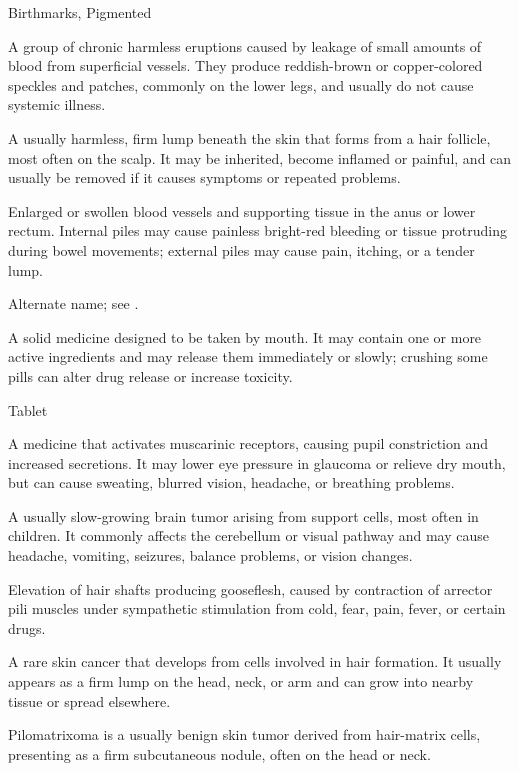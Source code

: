 \synonyms
Birthmarks, Pigmented

 A group of chronic harmless eruptions caused by leakage of small amounts of blood from superficial vessels. They produce reddish-brown or copper-colored speckles and patches, commonly on the lower legs, and usually do not cause systemic illness.

 A usually harmless, firm lump beneath the skin that forms from a hair follicle, most often on the scalp. It may be inherited, become inflamed or painful, and can usually be removed if it causes symptoms or repeated problems.

 Enlarged or swollen blood vessels and supporting tissue in the anus or lower rectum. Internal piles may cause painless bright-red bleeding or tissue protruding during bowel movements; external piles may cause pain, itching, or a tender lump.

 Alternate name; see .

 A solid medicine designed to be taken by mouth. It may contain one or more active ingredients and may release them immediately or slowly; crushing some pills can alter drug release or increase toxicity.

\synonyms
Tablet

 A medicine that activates muscarinic receptors, causing pupil constriction and increased secretions. It may lower eye pressure in glaucoma or relieve dry mouth, but can cause sweating, blurred vision, headache, or breathing problems.

 A usually slow-growing brain tumor arising from support cells, most often in children. It commonly affects the cerebellum or visual pathway and may cause headache, vomiting, seizures, balance problems, or vision changes.

 Elevation of hair shafts producing gooseflesh, caused by contraction of arrector pili muscles under sympathetic stimulation from cold, fear, pain, fever, or certain drugs.

 A rare skin cancer that develops from cells involved in hair formation. It usually appears as a firm lump on the head, neck, or arm and can grow into nearby tissue or spread elsewhere.

 Pilomatrixoma is a usually benign skin tumor derived from hair-matrix cells, presenting as a firm subcutaneous nodule, often on the head or neck.

